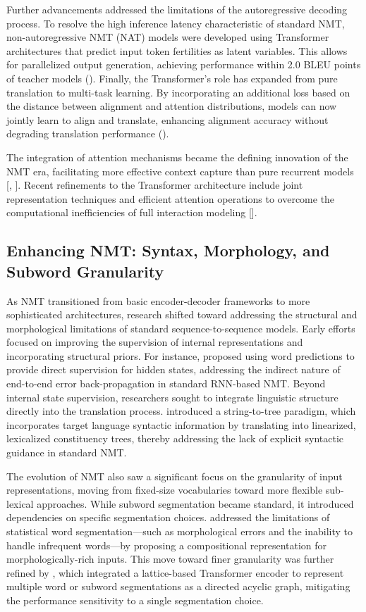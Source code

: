 \documentclass[11pt]{article}
\begin{document}
Further advancements addressed the limitations of the autoregressive decoding process. To resolve the high inference latency characteristic of standard NMT, non-autoregressive NMT (NAT) models were developed using Transformer architectures that predict input token fertilities as latent variables. This allows for parallelized output generation, achieving performance within 2.0 BLEU points of teacher models (\citep{1711.02281}). Finally, the Transformer's role has expanded from pure translation to multi-task learning. By incorporating an additional loss based on the distance between alignment and attention distributions, models can now jointly learn to align and translate, enhancing alignment accuracy without degrading translation performance (\citep{1909.02074}).

The integration of attention mechanisms became the defining innovation of the NMT era, facilitating more effective context capture than pure recurrent models [\citep{1709.07809}, \citep{1901.01122}]. Recent refinements to the Transformer architecture include joint representation techniques and efficient attention operations to overcome the computational inefficiencies of full interaction modeling [\citep{2002.06546}].
\subsection{Enhancing NMT: Syntax, Morphology, and Subword Granularity}

As NMT transitioned from basic encoder-decoder frameworks to more sophisticated architectures, research shifted toward addressing the structural and morphological limitations of standard sequence-to-sequence models. Early efforts focused on improving the supervision of internal representations and incorporating structural priors. For instance, \citep{1708.01771} proposed using word predictions to provide direct supervision for hidden states, addressing the indirect nature of end-to-end error back-propagation in standard RNN-based NMT. Beyond internal state supervision, researchers sought to integrate linguistic structure directly into the translation process. \citep{1704.04743} introduced a string-to-tree paradigm, which incorporates target language syntactic information by translating into linearized, lexicalized constituency trees, thereby addressing the lack of explicit syntactic guidance in standard NMT.

The evolution of NMT also saw a significant focus on the granularity of input representations, moving from fixed-size vocabularies toward more flexible sub-lexical approaches. While subword segmentation became standard, it introduced dependencies on specific segmentation choices. \citep{1805.02036} addressed the limitations of statistical word segmentation—such as morphological errors and the inability to handle infrequent words—by proposing a compositional representation for morphologically-rich inputs. This move toward finer granularity was further refined by \citep{1906.01282}, which integrated a lattice-based Transformer encoder to represent multiple word or subword segmentations as a directed acyclic graph, mitigating the performance sensitivity to a single segmentation choice.
\end{document}

